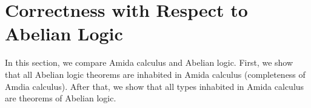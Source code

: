 


\section{Correctness with Respect to Abelian Logic}
\label{correct-abelian}

In this section, we compare Amida calculus and Abelian logic.
First, we show that all Abelian logic theorems are inhabited in Amida
calculus (completeness of Amdia calculus).
After that, we show that all types inhabited in Amida calculus are
theorems of Abelian logic.


